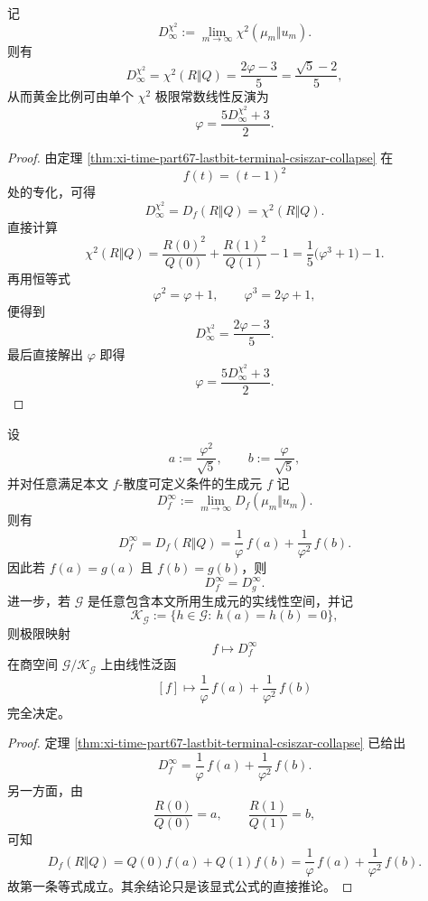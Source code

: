\begin{theorem}\label{thm:xi-time-part9sa-chi2-affine-phi-inversion}
记
\[
D_\infty^{\chi^2}
:=
\lim_{m\to\infty}\chi^2(\mu_m\Vert u_m).
\]
则有
\[
D_\infty^{\chi^2}
=
\chi^2(R\Vert Q)
=
\frac{2\varphi-3}{5}
=
\frac{\sqrt5-2}{5},
\]
从而黄金比例可由单个 \(\chi^2\) 极限常数线性反演为
\[
\varphi=\frac{5D_\infty^{\chi^2}+3}{2}.
\]
\end{theorem}
\begin{proof}
由定理 \ref{thm:xi-time-part67-lastbit-terminal-csiszar-collapse} 在
\[
f(t)=(t-1)^2
\]
处的专化，可得
\[
D_\infty^{\chi^2}
=
D_f(R\Vert Q)
=
\chi^2(R\Vert Q).
\]
直接计算
\[
\chi^2(R\Vert Q)
=
\frac{R(0)^2}{Q(0)}+\frac{R(1)^2}{Q(1)}-1
=
\frac{1}{5}\bigl(\varphi^3+1\bigr)-1.
\]
再用恒等式
\[
\varphi^2=\varphi+1,
\qquad
\varphi^3=2\varphi+1,
\]
便得到
\[
D_\infty^{\chi^2}
=
\frac{2\varphi-3}{5}.
\]
最后直接解出 \(\varphi\) 即得
\[
\varphi=\frac{5D_\infty^{\chi^2}+3}{2}.
\]
\end{proof}

\begin{corollary}\label{cor:xi-time-part9sa-fdiv-two-point-evaluation-closure}
设
\[
a:=\frac{\varphi^2}{\sqrt5},
\qquad
b:=\frac{\varphi}{\sqrt5},
\]
并对任意满足本文 \(f\)-散度可定义条件的生成元 \(f\) 记
\[
D_f^\infty:=\lim_{m\to\infty}D_f(\mu_m\Vert u_m).
\]
则有
\[
D_f^\infty
=
D_f(R\Vert Q)
=
\frac1\varphi\,f(a)+\frac1{\varphi^2}\,f(b).
\]
因此若 \(f(a)=g(a)\) 且 \(f(b)=g(b)\)，则
\[
D_f^\infty=D_g^\infty.
\]
进一步，若 \(\mathcal G\) 是任意包含本文所用生成元的实线性空间，并记
\[
\mathcal K_{\mathcal G}:=\{h\in\mathcal G:\ h(a)=h(b)=0\},
\]
则极限映射
\[
f\longmapsto D_f^\infty
\]
在商空间 \(\mathcal G/\mathcal K_{\mathcal G}\) 上由线性泛函
\[
[f]\longmapsto \frac1\varphi\,f(a)+\frac1{\varphi^2}\,f(b)
\]
完全决定。
\end{corollary}
\begin{proof}
定理 \ref{thm:xi-time-part67-lastbit-terminal-csiszar-collapse} 已给出
\[
D_f^\infty=\frac1\varphi\,f(a)+\frac1{\varphi^2}\,f(b).
\]
另一方面，由
\[
\frac{R(0)}{Q(0)}=a,
\qquad
\frac{R(1)}{Q(1)}=b,
\]
可知
\[
D_f(R\Vert Q)
=
Q(0)f(a)+Q(1)f(b)
=
\frac1\varphi\,f(a)+\frac1{\varphi^2}\,f(b).
\]
故第一条等式成立。其余结论只是该显式公式的直接推论。
\end{proof}
